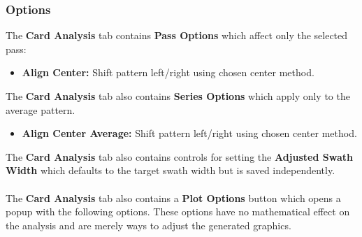 \documentclass[10pt,letterpaper,titlepage]{article}
\begin{document}
    \subsubsection{Options}
    The \textbf{Card Analysis} tab contains \textbf{Pass Options} which affect only the selected pass:
    \begin{itemize}
        \item \textbf{Align Center:} Shift pattern left/right using chosen center method.
    \end{itemize}
    The \textbf{Card Analysis} tab also contains \textbf{Series Options} which apply only to the average pattern.
    \begin{itemize}
        \item \textbf{Align Center Average:} Shift pattern left/right using chosen center method.
    \end{itemize}
    The \textbf{Card Analysis} tab also contains controls for setting the \textbf{Adjusted Swath Width} which defaults to the target swath width but is saved independently.\\\\
    The \textbf{Card Analysis} tab also contains a \textbf{Plot Options} button which opens a popup with the following options. These options have no mathematical effect on the analysis and are merely ways to adjust the generated graphics.
\end{document}
